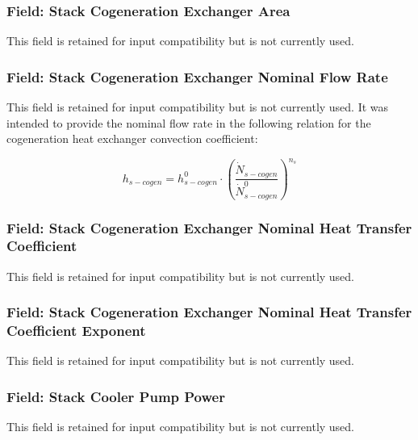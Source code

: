\subsubsection{Field: Stack Cogeneration Exchanger Area}\label{field-stack-cogeneration-exchanger-area}

This field is retained for input compatibility but is not currently used.

\subsubsection{Field: Stack Cogeneration Exchanger Nominal Flow Rate}\label{field-stack-cogeneration-exchanger-nominal-flow-rate}

This field is retained for input compatibility but is not currently used. It was intended to provide the nominal flow rate in the following relation for the cogeneration heat exchanger convection coefficient:

\begin{equation}
{h_{s - cogen}} = h_{s - cogen}^0 \cdot {\left( {\frac{{{{\dot N}_{s - cogen}}}}{{\dot N_{s - cogen}^0}}} \right)^{{n_s}}}
\end{equation}

\subsubsection{Field: Stack Cogeneration Exchanger Nominal Heat Transfer Coefficient}\label{field-stack-cogeneration-exchanger-nominal-heat-transfer-coefficient}

This field is retained for input compatibility but is not currently used.

\subsubsection{Field: Stack Cogeneration Exchanger Nominal Heat Transfer Coefficient Exponent}\label{field-stack-cogeneration-exchanger-nominal-heat-transfer-coefficient-exponent}

This field is retained for input compatibility but is not currently used.

\subsubsection{Field: Stack Cooler Pump Power}\label{field-stack-cooler-pump-power}

This field is retained for input compatibility but is not currently used.

